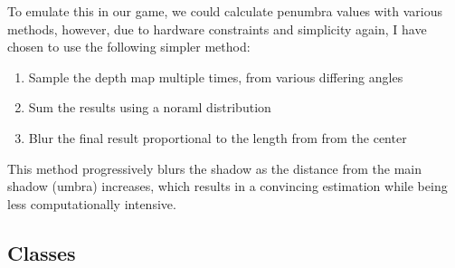 \documentclass[../main/main.tex]{subfiles}
\begin{document}
To emulate this in our game, we could calculate penumbra values with various methods, however, due to hardware constraints and simplicity again, I have chosen to use the following simpler method:

\begin{enumerate}
\item Sample the depth map multiple times, from various differing angles
\item Sum the results using a noraml distribution
\item Blur the final result proportional to the length from from the center
\end{enumerate}

This method progressively blurs the shadow as the distance from the main shadow (umbra) increases, which results in a convincing estimation while being less computationally intensive.


\subsection{Classes}
\end{document}
